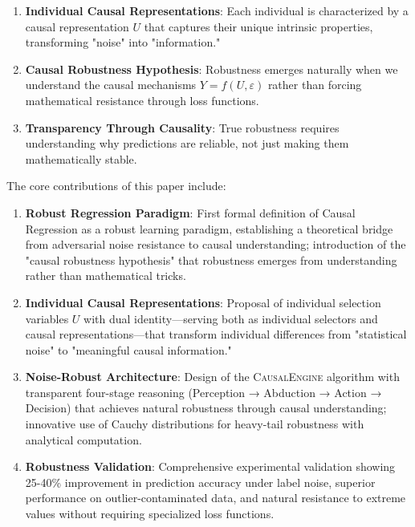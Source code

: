 \documentclass[letterpaper]{article} %
\newcommand{\causalengine}{\textsc{CausalEngine}}
\begin{document}
\begin{enumerate}
\item \textbf{Individual Causal Representations}: Each individual is characterized by a causal representation $U$ that captures their unique intrinsic properties, transforming "noise" into "information."

\item \textbf{Causal Robustness Hypothesis}: Robustness emerges naturally when we understand the causal mechanisms $Y = f(U, \varepsilon)$ rather than forcing mathematical resistance through loss functions.

\item \textbf{Transparency Through Causality}: True robustness requires understanding why predictions are reliable, not just making them mathematically stable.
\end{enumerate}

The core contributions of this paper include:

\begin{enumerate}
\item \textbf{Robust Regression Paradigm}: First formal definition of Causal Regression as a robust learning paradigm, establishing a theoretical bridge from adversarial noise resistance to causal understanding; introduction of the "causal robustness hypothesis" that robustness emerges from understanding rather than mathematical tricks.

\item \textbf{Individual Causal Representations}: Proposal of individual selection variables $U$ with dual identity—serving both as individual selectors and causal representations—that transform individual differences from "statistical noise" to "meaningful causal information."

\item \textbf{Noise-Robust Architecture}: Design of the \causalengine{} algorithm with transparent four-stage reasoning (Perception → Abduction → Action → Decision) that achieves natural robustness through causal understanding; innovative use of Cauchy distributions for heavy-tail robustness with analytical computation.

\item \textbf{Robustness Validation}: Comprehensive experimental validation showing 25-40\% improvement in prediction accuracy under label noise, superior performance on outlier-contaminated data, and natural resistance to extreme values without requiring specialized loss functions.
\end{enumerate}
\end{document}
